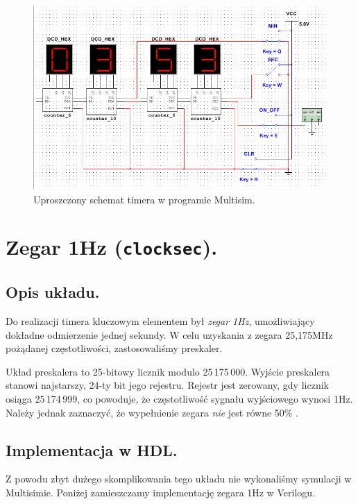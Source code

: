 \documentclass[a4paper,oneside]{report}
\newcommand{\clocksec}{\texttt{clock\textunderscore sec}}
\begin{document}


\begin{figure}[h]
\centering
\includegraphics[width=\textwidth]{multisim/timer.png}
\caption[Uproszczony schemat timera.]{Uproszczony schemat timera w programie Multisim.}
\label{timer_scheme}
\end{figure}

\section{Zegar 1Hz (\clocksec).}
\subsection{Opis układu.}
Do realizacji timera kluczowym elementem był \emph{zegar 1Hz},
umożliwiający dokładne odmierzenie jednej sekundy. 
W celu uzyskania z zegara 25,175MHz pożądanej częstotliwości, 
zastosowaliśmy preskaler.

Układ preskalera to 25-bitowy licznik modulo 25\,175\,000. 
Wyjście preskalera stanowi najstarszy, 24-ty bit jego rejestru. 
Rejestr jest zerowany, gdy licznik osiąga 25\,174\,999, co powoduje, że
częstotliwość sygnału wyjściowego wynosi 1Hz. Należy jednak
zaznaczyć, że wypełnienie zegara \emph{nie} jest równe 50\% .

\subsection{Implementacja w HDL.}
Z powodu zbyt dużego skomplikowania tego układu nie wykonaliśmy
symulacji w Multisimie. Poniżej zamieszczamy implementację zegara
1Hz w Verilogu.

\pagebreak

\end{document}
